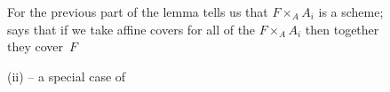         \begin{figure}[h!]
            \centering
            \begin{minipage}[t]{0.73\textwidth}
                \vspace{0pt}
                \caption{(ii) -- a special case of \cite[Lemme~2.20,~\S2.4]{Toen:2005wxa}}\label{fg:recollement-affine-ii}
            \end{minipage}
            \hfill
            \begin{minipage}[t]{0.23\textwidth}
                \vspace{0pt}
                {\footnotesize For  the previous part of the lemma tells us that \mbox{$F\times_A A_i$} is a scheme;  says that if we take affine covers for all of the \mbox{$F\times_A A_i$} then together they cover~$F$}
            \end{minipage}
        \end{figure}

